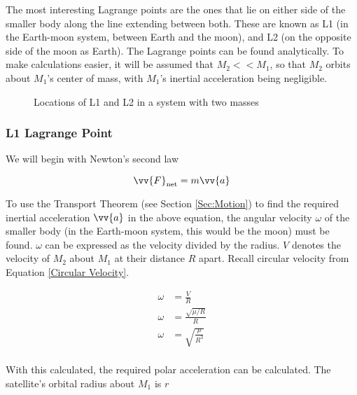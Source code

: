 \documentclass[../basicOrbitalDynamics.tex]{subfiles}
\begin{document}
The most interesting Lagrange points are the ones that lie on either side of the smaller body along the line extending between both. These are known as L1 (in the Earth-moon system, between Earth and the moon), and L2 (on the opposite side of the moon as Earth). The Lagrange points can be found analytically. To make calculations easier, it will be assumed that $M_2<<M_1$, so that $M_2$ orbits about $M_1$'s center of mass, with $M_1$'s inertial acceleration being negligible.

\begin{figure}[H]
    \centering
    \caption{Locations of L1 and L2 in a system with two masses}\label{fig:Lagrange Points}
\end{figure}

\subsubsection{L1 Lagrange Point}

We will begin with Newton's second law

$$\st{\vv{F}}{net}=m\vv{a}$$

To use the Transport Theorem (see Section \ref{Sec:Motion}) to find the required inertial acceleration $\vv{a}$ in the above equation, the angular velocity $\omega$ of the smaller body (in the Earth-moon system, this would be the moon) must be found. $\omega$ can be expressed as the velocity divided by the radius. $V$ denotes the velocity of $M_2$ about $M_1$ at their distance $R$ apart. Recall circular velocity from Equation \eqref{Circular Velocity}.

\begin{align*}
    \omega&=\frac{V}{R}\\
    \omega&=\frac{\sqrt{\mu/R}}{R}\\
    \omega&=\sqrt{\frac{\mu}{R^3}}\\
\end{align*}

With this calculated, the required polar acceleration can be calculated. The satellite's orbital radius about $M_1$ is $r$
\end{document}

